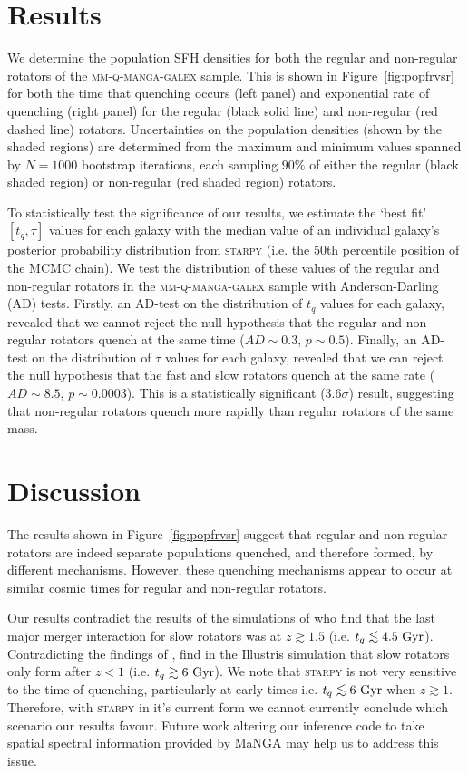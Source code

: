 \documentclass[useAMS,usenatbib]{mn2e}
\def\lesssim{\mathrel{\hbox{\rlap{\hbox{\lower3pt\hbox{$\sim$}}}\hbox{\raise2pt\hbox{$<$}}}}}
\begin{document}
\section{Results}\label{sec:results}

We determine the population SFH densities for both the regular and non-regular rotators of the \textsc{mm-q-manga-galex} sample. This is shown in Figure~\ref{fig:popfrvsr} for both the time that quenching occurs (left panel) and exponential rate of quenching (right panel) for the regular (black solid line) and non-regular (red dashed line) rotators. Uncertainties on the population densities (shown by the shaded regions) are determined from the maximum and minimum values spanned by $N = 1000$ bootstrap iterations, each sampling $90\%$ of either the regular (black shaded region) or non-regular (red shaded region) rotators. 

To statistically test the significance of our results, we estimate the `best fit' $[t_q, \tau]$ values for each galaxy with the median value of an individual galaxy's posterior probability distribution from \textsc{starpy} (i.e. the 50th percentile position of the MCMC chain). We test the distribution of these values of the regular and non-regular rotators in the \textsc{mm-q-manga-galex} sample with Anderson-Darling (AD) tests. Firstly, an AD-test on the distribution of $t_q$ values for each galaxy, revealed that we cannot reject the null hypothesis that the regular and non-regular rotators quench at the same time ($AD\sim 0.3$, $p \sim 0.5$). Finally, an AD-test on the distribution of $\tau$ values for each galaxy, revealed that we can reject the null hypothesis that the fast and slow rotators quench at the same rate ($AD\sim 8.5$, $p \sim 0.0003$). This is a statistically significant ($3.6\sigma$) result, suggesting that non-regular rotators quench more rapidly than regular rotators of the same mass.


\section{Discussion}\label{sec:discussion}

The results shown in Figure~\ref{fig:popfrvsr} suggest that regular and non-regular rotators are indeed separate populations quenched, and therefore formed, by different mechanisms. However, these quenching mechanisms appear to occur at similar cosmic times for regular and non-regular rotators.

Our results contradict the results of the simulations of \cite{khochfar11} who find that the last major merger interaction for slow rotators was at $z \gtrsim 1.5$ (i.e. $t_q \lesssim 4.5~\rm{Gyr}$). Contradicting the findings of \citeauthor{khochfar11}, \cite{penoyre17} find in the Illustris simulation that slow rotators only form after $z < 1$ (i.e. $t_q \gtrsim 6~\rm{Gyr}$). We note that \textsc{starpy} is not very sensitive to the time of quenching, particularly at early times i.e. $t_q \lesssim 6~\rm{Gyr}$ when $z \gtrsim 1$. Therefore, with \textsc{starpy} in it's current form we cannot currently conclude which scenario our results favour. Future work altering our inference code to take spatial spectral information provided by MaNGA may help us to address this issue.
\end{document}
